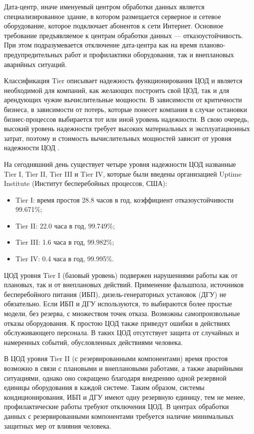 Дата-центр, иначе именуемый центром обработки данных является специализированное здание, в котором размещается серверное и сетевое оборудование, которое подключает абонентов к сети Интернет.
Основное требование предъявляемое к центрам обработки данных --- отказоустойчивость.
При этом подразумевается отключение дата-центра как на время планово-предупредительных работ и профилактики оборудования, так и внеплановых аварийных ситуаций.

Классификация Tier описывает надежность функционирования ЦОД и является необходимой для компаний, как желающих построить свой ЦОД, так и для арендующих чужие вычислительные мощности.
В зависимости от критичности бизнеса, в зависимости от потерь, которые понесет компания в случае остановки бизнес-процессов выбирается тот или иной уровень надежности.
В свою очередь, высокий уровень надежности требует высоких материальных и эксплуатационных затрат, поэтому и стоимость вычислительных мощностей зависит от уровня надежности ЦОД \cite{dc-tier}.

На сегодняшний день существует четыре уровня надежности ЦОД названные Tier I, Tier II, Tier III и Tier IV, которые были введены организацией Uptime Institute (Институт бесперебойных процессов, США):
\begin{itemize}
  \item Tier I: время простоя 28.8 часов в год, коэффициент отказоустойчивости 99.671\%;
  \item Tier II: 22.0 часа в год, 99.749\%;
  \item Tier III: 1.6 часа в год, 99.982\%;
  \item Tier IV: 0.4 часа в год, 99.995\%.
\end{itemize}

ЦОД уровня Tier I (базовый уровень) подвержен нарушениями работы как от плановых, так и от внеплановых действий.
Применение фальшпола, источников бесперебойного питания (ИБП), дизель-генераторных установок (ДГУ) не обязательно.
Если ИБП и ДГУ используются, то выбираются более простые модели, без резерва, с множеством точек отказа.
Возможны самопроизвольные отказы оборудования.
К простою ЦОД также приведут ошибки в действиях обслуживающего персонала.
В таких ЦОД отсутствует защита от случайных и намеренных событий, обусловленных действиями человека.

В ЦОД уровня Tier II (с резервированными компонентами) время простоя возможно в связи с плановыми и внеплановыми работами, а также аварийными ситуациями, однако оно сокращено благодаря внедрению одной резервной единицы оборудования в каждой системе.
Таким образом, системы кондиционирования, ИБП и ДГУ имеют одну резервную единицу, тем не менее, профилактические работы требуют отключения ЦОД.
В центрах обработки данных с резервированными компонентами требуется наличие минимальных защитных мер от влияния человека.

